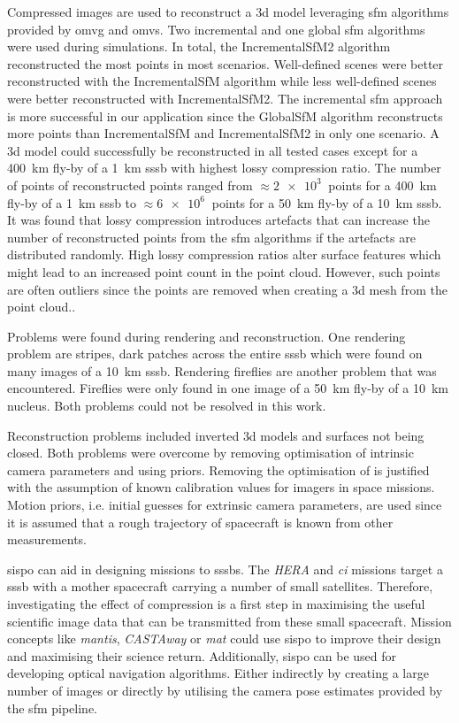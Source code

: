 Compressed images are used to reconstruct a \gls{3d} model leveraging \gls{sfm} algorithms provided by \gls{omvg} and \gls{omvs}. Two incremental and one global \gls{sfm} algorithms were used during simulations. In total, the IncrementalSfM2 algorithm reconstructed the most points in most scenarios. Well-defined scenes were better reconstructed with the IncrementalSfM algorithm while less well-defined scenes were better reconstructed with IncrementalSfM2. The incremental \gls{sfm} approach is more successful in our application since the GlobalSfM algorithm reconstructs more points than IncrementalSfM and IncrementalSfM2 in only one scenario. A \gls{3d} model could successfully be reconstructed in all tested cases except for a \SI{400}{\kilo\meter} fly-by of a \SI{1}{\kilo\meter} \gls{sssb} with highest lossy compression ratio. The number of points of reconstructed points ranged from $\approx \SI{2e3}{}$ points for a \SI{400}{\kilo\meter} fly-by of a \SI{1}{\kilo\meter} \gls{sssb} to $\approx \SI{6e6}{}$ points for a \SI{50}{\kilo\meter} fly-by of a \SI{10}{\kilo\meter} \gls{sssb}. It was found that lossy compression introduces artefacts that can increase the number of reconstructed points from the \gls{sfm} algorithms if the artefacts are distributed randomly. High lossy compression ratios alter surface features which might lead to an increased point count in the point cloud. However, such points are often outliers since the points are removed when creating a \gls{3d} mesh from the point cloud..

Problems were found during rendering and reconstruction. One rendering problem are stripes, dark patches across the entire \gls{sssb} which were found on many images of a \SI{10}{\kilo\meter} \gls{sssb}. Rendering fireflies are another problem that was encountered. Fireflies  were only found in one image of a \SI{50}{\kilo\meter} fly-by of a \SI{10}{\kilo\meter} nucleus. Both problems could not be resolved in this work.

Reconstruction problems included inverted \gls{3d} models and surfaces not being closed. Both problems were overcome by removing optimisation of intrinsic camera parameters and using priors. Removing the optimisation of is justified with the assumption of known calibration values for imagers in space missions. Motion priors, i.e. initial guesses for extrinsic camera parameters, are used since it is assumed that a rough trajectory of spacecraft is known from other measurements.

\Gls{sispo} can aid in designing missions to \glspl{sssb}. The \textit{HERA} and \textit{\gls{ci}} missions target a \gls{sssb} with a mother spacecraft carrying a number of small satellites. Therefore, investigating the effect of compression is a first step in maximising the useful scientific image data that can be transmitted from these small spacecraft. Mission concepts like \textit{\gls{mantis}}, \textit{CASTAway} or \textit{\gls{mat}} could use \gls{sispo} to improve their design and maximising their science return. Additionally, \gls{sispo} can be used for developing optical navigation algorithms. Either indirectly by creating a large number of images or directly by utilising the camera pose estimates provided by the \gls{sfm} pipeline.

